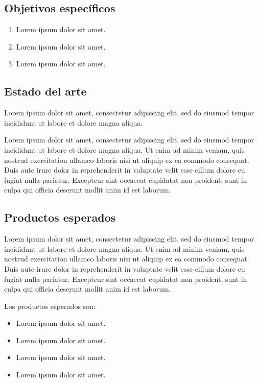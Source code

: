 \subsection{Objetivos específicos}

\begin{enumerate}[label=\arabic*.]
    \item Lorem ipsum dolor sit amet.
    \item Lorem ipsum dolor sit amet.
    \item Lorem ipsum dolor sit amet.
\end{enumerate}


\subsection{Estado del arte}

Lorem ipsum dolor sit amet, consectetur adipiscing elit, sed do eiusmod tempor incididunt ut labore et dolore magna aliqua.

Lorem ipsum dolor sit amet, consectetur adipiscing elit, sed do eiusmod tempor incididunt ut labore et dolore magna aliqua. Ut enim ad minim veniam, quis nostrud exercitation ullamco laboris nisi ut aliquip ex ea commodo consequat. Duis aute irure dolor in reprehenderit in voluptate velit esse cillum dolore eu fugiat nulla pariatur. Excepteur sint occaecat cupidatat non proident, sunt in culpa qui officia deserunt mollit anim id est laborum.


\subsection{Productos esperados}

Lorem ipsum dolor sit amet, consectetur adipiscing elit, sed do eiusmod tempor incididunt ut labore et dolore magna aliqua. Ut enim ad minim veniam, quis nostrud exercitation ullamco laboris nisi ut aliquip ex ea commodo consequat. Duis aute irure dolor in reprehenderit in voluptate velit esse cillum dolore eu fugiat nulla pariatur. Excepteur sint occaecat cupidatat non proident, sunt in culpa qui officia deserunt mollit anim id est laborum.

Los productos esperados son:
\begin{itemize}[noitemsep]
    \item Lorem ipsum dolor sit amet.
    \item Lorem ipsum dolor sit amet.
    \item Lorem ipsum dolor sit amet.
    \item Lorem ipsum dolor sit amet.
\end{itemize}